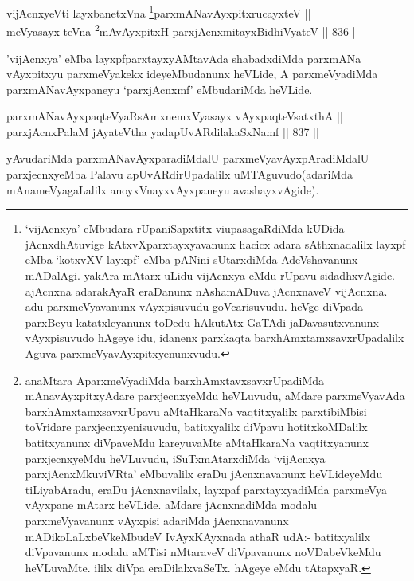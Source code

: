 \begin{shl}
vijAcnxyeVti layxbanetxVna \footnote{`vijAcnxya' eMbudara rUpaniSapxtitx viupasagaRdiMda kUDida jAcnxdhAtuvige kAtxvXparxtayxyavanunx hacicx adara sAthxnadalilx layxpf eMba `kotxvXV layxpf' eMba pANini sUtarxdiMda AdeVshavanunx mADalAgi. yakAra mAtarx uLidu vijAcnxya eMdu rUpavu sidadhxvAgide. ajAcnxna adarakAyaR eraDanunx nAshamADuva jAcnxnaveV vijAcnxna. adu parxmeVyavanunx vAyxpisuvudu goVcarisuvudu. heVge diVpada parxBeyu katatxleyanunx toDedu hAkutAtx GaTAdi jaDavasutxvanunx vAyxpisuvudo hAgeye idu, idanenx parxkaqta barxhAmxtamxsavxrUpadalilx Aguva parxmeVyavAyxpitxyenunxvudu.}parxmANavAyxpitxrucayxteV ||  \\
meVyasayx teVna \footnote{anaMtara AparxmeVyadiMda barxhAmxtavxsavxrUpadiMda mAnavAyxpitxyAdare parxjecnxyeMdu heVLuvudu, aMdare parxmeVyavAda barxhAmxtamxsavxrUpavu aMtaHkaraNa vaqtitxyalilx parxtibiMbisi  toVridare parxjecnxyenisuvudu, batitxyalilx diVpavu hotitxkoMDalilx batitxyanunx diVpaveMdu kareyuvaMte aMtaHkaraNa vaqtitxyanunx parxjecnxyeMdu heVLuvudu, iSuTxmAtarxdiMda `vijAcnxya parxjAcnxMkuviVRta' eMbuvalilx eraDu jAcnxnavanunx heVLideyeMdu tiLiyabAradu, eraDu jAcnxnavilalx, layxpaf parxtayxyadiMda parxmeVya vAyxpane mAtarx heVLide. aMdare jAcnxnadiMda modalu parxmeVyavanunx vAyxpisi adariMda jAcnxnavanunx mADikoLaLxbeVkeMbudeV IvAyxKAyxnada athaR udA:- batitxyalilx diVpavanunx modalu aMTisi nMtaraveV diVpavanunx noVDabeVkeMdu heVLuvaMte. ililx diVpa eraDilalxvaSeTx. hAgeye eMdu tAtapxyaR.}mAvAyxpitxH parxjAcnxmitayxBidhiVyateV \hfill || 836 ||  
\end{shl}


\begin{artha}
'vijAcnxya' eMba layxpfparxtayxyAMtavAda shabadxdiMda parxmANa vAyxpitxyu parxmeVyakekx ideyeMbudanunx heVLide, A parxmeVyadiMda parxmANavAyxpaneyu `parxjAcnxmf' eMbudariMda heVLide.
\end{artha}


\begin{shl}
parxmANavAyxpaqteVyaRsAmxnemxVyasayx vAyxpaqteVsatxthA ||  \\
parxjAcnxPalaM jAyateV\s tha yadapUvARdilakaSxNamf \hfill || 837 ||  
\end{shl}

\begin{artha}
yAvudariMda parxmANavAyxparadiMdalU parxmeVyavAyxpAradiMdalU parxjecnxyeMba Palavu apUvARdirUpadalilx uMTAguvudo(adariMda mAnameVyagaLalilx anoyxVnayxvAyxpaneyu avashayxvAgide).
\end{artha}


